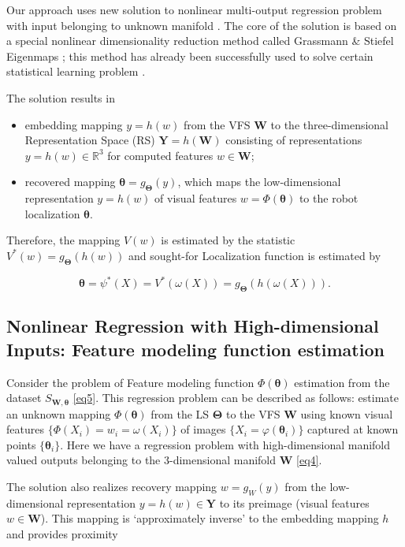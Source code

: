 \documentclass[conference]{IEEEtran} %
\def\mbW{\mathbf{W}}
\def\mbTheta{{\bm\Theta}}
\def\mbtheta{{\bm\theta}}
\def\mbY{\mathbf{Y}}
\def\RR{\mathbb{R}}
\begin{document}
Our approach uses new solution to nonlinear multi-output regression problem with input belonging to unknown manifold  \cite{bib20}. The core of the solution is based on a special nonlinear dimensionality reduction method called Grassmann \& Stiefel Eigenmaps \cite{bib21,bib22}; this method has already been successfully used to solve certain statistical learning problem \cite{bib23}.

The solution \cite{bib20} results in
\begin{itemize}
	\item embedding mapping $y = h(w)$ from the VFS $\mbW$ to the three-dimensional Representation Space (RS) $\mbY = h(\mbW)$ consisting of representations $y = h(w) \in \RR^3$ for computed features $w \in \mbW$;
    \item recovered mapping $\mbtheta= g_{\mbTheta}(y)$, which maps the low-dimensional representation $y = h(w)$ of visual features $w = \Phi(\mbtheta)$ to the robot localization $\mbtheta$.
\end{itemize}

Therefore, the mapping $V(w)$ is estimated by the statistic $V^*(w) = g_{\mbTheta}(h(w))$ and sought-for Localization function is estimated by

\begin{equation}
\label{eq6}
	\mbtheta = \psi^*(X) = V^*(\omega(X)) = g_{\mbTheta}(h(\omega(X))).
\end{equation}

\subsection{Nonlinear Regression with High-dimensional Inputs: Feature modeling function estimation}

Consider the problem of Feature modeling function $\Phi(\mbtheta)$ estimation from the dataset $S_{\mathbf{W},\mbtheta}$ \eqref{eq5}. This regression problem can be described as follows: estimate an unknown mapping $\Phi(\mbtheta)$ from the LS $\mbTheta$ to the VFS $\mbW$ using known visual features $\{\Phi(X_i) = w_i = \omega(X_i)\}$ of images $\{X_i = \varphi(\mbtheta_i)\}$ captured at known points $\{\mbtheta_i\}$. Here we have a regression problem with high-dimensional manifold valued outputs belonging to the $3$-dimensional manifold $\mbW$ \eqref{eq4}.

The solution \cite{bib20} also realizes recovery mapping $w = g_W(y)$ from the low-dimensional representation $y = h(w) \in \mbY$ to its preimage (visual features $w \in \mbW$). This mapping is `approximately inverse' to the embedding mapping $h$ and provides proximity
\end{document}
